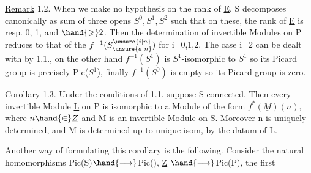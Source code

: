 \uline{Remark} 1.2. When we make no hypothesis on the rank of \underline{E}, S
decomposes canonically as sum of three opens $S^0,S^1,S^2$ such that on
these, the rank of \underline{E} is resp. 0, 1, and $\hand{\geqslant} 2$. Then the determination of
invertible Modules on P reduces to that of the $f^{-1}(S^{\unsure{i|n}}_{\unsure{a|n}})$ for i=0,1,2.
The case i=2 can be dealt with by 1.1., on the other hand $f^{-1}(S^1)$ is $S^1$-isomorphic
to $S^1$ so its Picard group is precisely Pic($S^1$), finally
$f^{-1}(S^0)$ is empty so its Picard group is zero.

\uline{Corollary} 1.3. Under the conditions of 1.1. suppose S connected. Then
every invertible Module \underline{L} on P is isomorphic to a Module of the form
$f^*(\underline{M})(n)$, where $n\hand{\in}\underline{Z}$ and \underline{M} is an invertible Module on S. Moreover n is
uniquely determined, and \underline{M} is determined up to unique isom, by the datum
of \underline{L}.

Another way of formulating this corollary is the following. Consider
the natural homomorphisms Pic(S)$\hand{\longrightarrow}$Pic(), \underline{Z} $\hand{\longrightarrow}$Pic(P), the first

